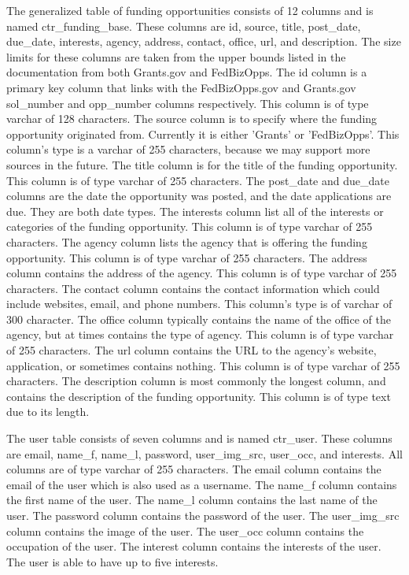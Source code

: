 \documentclass[onecolumn]{IEEEtran}
\begin{document}
The generalized table of funding opportunities consists of 12 columns and is named ctr\_funding\_base. These columns are id, source, title, post\_date, due\_date, interests, agency, address, contact, office, url, and description. The size limits for these columns are taken from the upper bounds listed in the documentation from both Grants.gov and FedBizOpps. The id column is a primary key column that links with the FedBizOpps.gov and Grants.gov sol\_number and opp\_number columns respectively. This column is of type varchar of 128 characters. The source column is to specify where the funding opportunity originated from. Currently it is either 'Grants' or 'FedBizOpps'. This column's type is a varchar of 255 characters, because we may support more sources in the future. The title column is for the title of the funding opportunity. This column is of type varchar of 255 characters. The post\_date and due\_date columns are the date the opportunity was posted, and the date applications are due. They are both date types. The interests column list all of the interests or categories of the funding opportunity. This column is of type varchar of 255 characters. The agency column lists the agency that is offering the funding opportunity. This column is of type varchar of 255 characters. The address column contains the address of the agency. This column is of type varchar of 255 characters. The contact column contains the contact information which could include websites, email, and phone numbers. This column's type is of varchar of 300 character. The office column typically contains the name of the office of the agency, but at times contains the type of agency. This column is of type varchar of 255 characters. The url column contains the URL to the agency's website, application, or sometimes contains nothing. This column is of type varchar of 255 characters. The description column is most commonly the longest column, and contains the description of the funding opportunity. This column is of type text due to its length.
 
The user table consists of seven columns and is named ctr\_user. These columns are email, name\_f, name\_l, password, user\_img\_src, user\_occ, and interests. All columns are of type varchar of 255 characters. The email column contains the email of the user which is also used as a username. The name\_f column contains the first name of the user. The name\_l column contains the last name of the user. The password column contains the password of the user. The user\_img\_src column contains the image of the user. The user\_occ column contains the occupation of the user. The interest column contains the interests of the user. The user is able to have up to five interests. 
 
\end{document}
